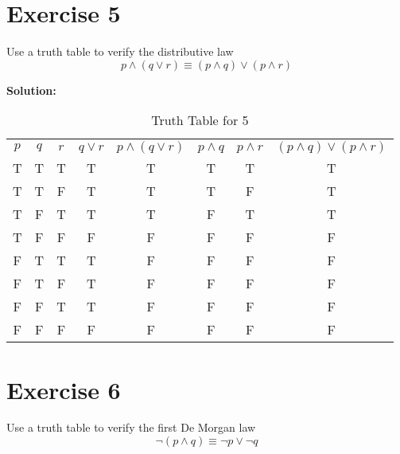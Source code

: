 \documentclass{Axon}
\begin{document}
\section*{Exercise 5}
Use a truth table to verify the distributive law
\begin{equation}
    p \land (q \lor r) \equiv (p \land q) \lor (p \land r)
\end{equation}

\noindent
\textbf{Solution:}

\begin{table}[ht]
    \centering
    \begin{tabular}{c|c|c|c|c|c|c|c}
        \(p\) & \(q\) & \(r\) & \(q \lor r\) & \(p \land (q \lor r)\) & \(p \land q\) & \(p \land r\) & \((p \land q) \lor (p \land r)\) \\
        T     & T     & T     & T            & T                      & T             & T             & T                                \\
        T     & T     & F     & T            & T                      & T             & F             & T                                \\
        T     & F     & T     & T            & T                      & F             & T             & T                                \\
        T     & F     & F     & F            & F                      & F             & F             & F                                \\
        F     & T     & T     & T            & F                      & F             & F             & F                                \\
        F     & T     & F     & T            & F                      & F             & F             & F                                \\
        F     & F     & T     & T            & F                      & F             & F             & F                                \\
        F     & F     & F     & F            & F                      & F             & F             & F
    \end{tabular}
    \caption{Truth Table for 5}
\end{table}

\section*{Exercise 6}
Use a truth table to verify the first De Morgan law
\begin{equation}
    \lnot (p \land q) \equiv \lnot p \lor \lnot q
\end{equation}
\end{document}
